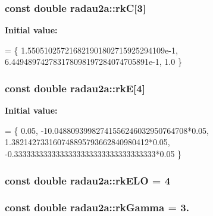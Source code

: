 \subsubsection[{\texorpdfstring{rkC}{rkC}}]{\setlength{\rightskip}{0pt plus 5cm}const double radau2a\+::rkC\mbox{[}3\mbox{]}\hspace{0.3cm}{\ttfamily [static]}}\hypertarget{namespaceradau2a_a7e8fecc1a981ceff1796a595b0ef5b4a}{}\label{namespaceradau2a_a7e8fecc1a981ceff1796a595b0ef5b4a}
{\bfseries Initial value\+:}
\begin{DoxyCode}
= \{
1.550510257216821901802715925294109e-1,
6.449489742783178098197284074705891e-1,
1.0
\}
\end{DoxyCode}
\subsubsection[{\texorpdfstring{rkE}{rkE}}]{\setlength{\rightskip}{0pt plus 5cm}const double radau2a\+::rkE\mbox{[}4\mbox{]}\hspace{0.3cm}{\ttfamily [static]}}\hypertarget{namespaceradau2a_ae792ec3177ed6d29903669bcde591f94}{}\label{namespaceradau2a_ae792ec3177ed6d29903669bcde591f94}
{\bfseries Initial value\+:}
\begin{DoxyCode}
= \{
    0.05,
    -10.04880939982741556246032950764708*0.05,
    1.382142733160748895793662840980412*0.05,
    -0.3333333333333333333333333333333333*0.05
    \}
\end{DoxyCode}
\subsubsection[{\texorpdfstring{rk\+E\+LO}{rkELO}}]{\setlength{\rightskip}{0pt plus 5cm}const double radau2a\+::rk\+E\+LO = 4\hspace{0.3cm}{\ttfamily [static]}}\hypertarget{namespaceradau2a_a8f0bf108626219e500ffe0b78c01b246}{}\label{namespaceradau2a_a8f0bf108626219e500ffe0b78c01b246}
\subsubsection[{\texorpdfstring{rk\+Gamma}{rkGamma}}]{\setlength{\rightskip}{0pt plus 5cm}const double radau2a\+::rk\+Gamma = 3.\hspace{0.3cm}{\ttfamily [static]}}\hypertarget{namespaceradau2a_a188fa0b309eb2826403d911684735824}{}\label{namespaceradau2a_a188fa0b309eb2826403d911684735824}
